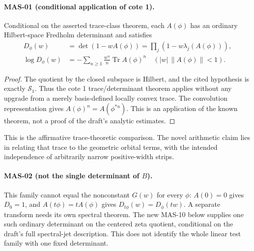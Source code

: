 \documentclass[11pt,a4paper]{article}
\newcommand{\Tr}{\operatorname{Tr}}
\newcommand{\fid}[1]{\textsf{#1}}
\begin{document}
\paragraph{MAS-01 (conditional application of cote 1).}
Conditional on the asserted trace-class theorem, each $A(\phi)$ has an ordinary Hilbert-space Fredholm determinant and satisfies
\begin{align*}
 D_\phi(w)&=\det(1-wA(\phi))=\prod_j(1-w\lambda_j(A(\phi))),\\
 \log D_\phi(w)&=-\sum_{n\ge1}\frac{w^n}{n}\Tr A(\phi)^n
 \quad (|w|\,\|A(\phi)\|<1).
\end{align*}
\begin{proof}
The quotient by the closed subspace is Hilbert, and the cited hypothesis is exactly $\mathcal S_1$. Thus the cote 1 trace/determinant theorem applies without any upgrade from a merely basis-defined locally convex trace. The convolution representation gives $A(\phi)^n=A(\phi^{*n})$. This is an application of the known theorem, not a proof of the draft's analytic estimates.
\end{proof}
This is the affirmative trace-theoretic comparison. The novel arithmetic claim lies in relating that trace to the geometric orbital terms, with the intended independence of arbitrarily narrow positive-width strips.

\paragraph{MAS-02 (not the single determinant of $B$).}
This family cannot equal the nonconstant $G(w)$ for every $\phi$: $A(0)=0$ gives $D_0=1$, and $A(t\phi)=tA(\phi)$ gives $D_{t\phi}(w)=D_\phi(tw)$. A separate transform needs its own spectral theorem. The new \fid{MAS-10} below supplies one such ordinary determinant on the centered zeta quotient, conditional on the draft's full spectral-jet description. This does not identify the whole linear test family with one fixed determinant.
\end{document}
